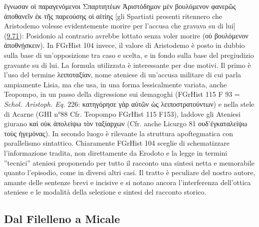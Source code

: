{    \textgreek{ἔγνωσαν οἱ παραγενόμενοι Σπαρτιητέων Ἀριστόδημον μὲν βουλόμενον φανερῶς ἀποθανεῖν ἐκ τῆς παρεούσης οἱ αἰτίης} [gli Spartiati presenti ritennero che Aristodemo volesse evidentemente morire per l'accusa che gravava su di lui] (\href{http://data.perseus.org/citations/urn:cts:greekLit:tlg0016.tlg001.perseus-grc1:9.71}{9.71}): Posidonio al contrario avrebbe lottato senza voler morire (\textgreek{οὐ βουλόμενον ἀποθνῄσκειν}). In FGrHist 104 invece, il valore di Aristodemo è posto in dubbio sulla base di un'opposizione tra caso e scelta, e in fondo sulla base del pregiudizio gravante su di lui. La formula utilizzata è interessante per due motivi. Il primo è l'uso del termine  \textgreek{λειποταξίαν}, nome ateniese di un'accusa militare di cui parla ampiamente Lisia, ma che usa, in una forma lessicalmente variata, anche Teopompo, in un passo della digressione sui demagoghi (FGrHist 115 F 93 = \emph{Schol. Aristoph. Eq.} 226: \textgreek{κατηγόρησε γὰρ αὐτῶν ὡς λειποστρατούντων}) e nella stele di Acarne\label{ref:stelediacarne} (GHI n°88 Cfr. Teopompo  FGrHist 115 F153), laddove gli Ateniesi giurano \textgreek{καὶ οὐκ ἀπολείψω τὸν ταξίαρχων} (Cfr. anche Licurgo  81 \textgreek{ουδ’ἐγκαταλείψω τοὺς ἡγεμόνας}). In secondo luogo è rilevante la struttura apoftegmatica con parallelismo sintattico. Chiaramente FGrHist 104 sceglie di schematizzare l'informazione tradita, non direttamente da Erodoto e la legge in termini ''tecnici'' ateniesi proponendo per tutto il racconto una sintesi netta e memorabile quanto l'episodio, come in diversi altri casi. Il tratto è peculiare del nostro autore, amante delle sentenze brevi e incisive e si notano ancora l'interferenza dell'ottica ateniese e le modalità della selezione e sintesi del racconto storico.
    \subsection*{Dal Filelleno a Micale}
}

